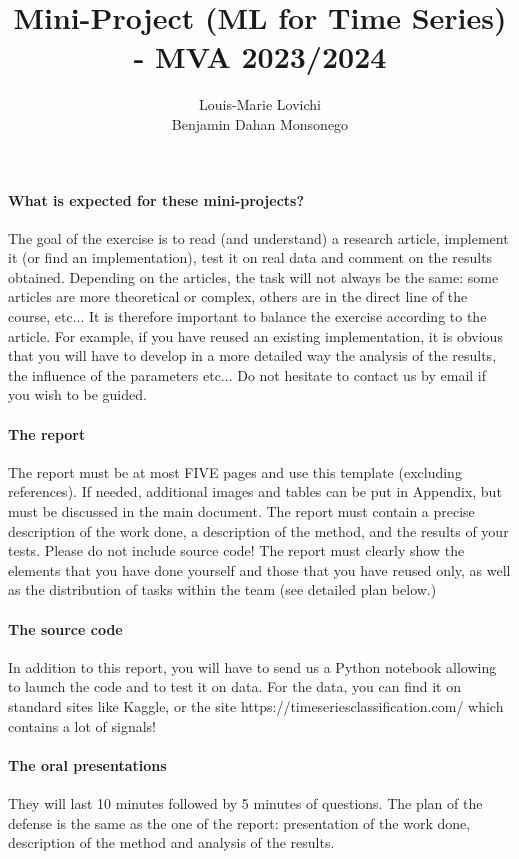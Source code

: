 \documentclass[11pt]{article}
\title{Mini-Project (ML for Time Series) - MVA 2023/2024}
\author{
Louis-Marie Lovichi \email{lm.lovichi@me.com} \\ %
Benjamin Dahan Monsonego \email{benjamin.dahan\_monsonego@ens-paris-saclay.fr} %
}
\begin{document}
\maketitle

\paragraph{What is expected for these mini-projects?}
The goal of the exercise is to read (and understand) a research article, implement it (or find an implementation), test it on real data and comment on the results obtained.
Depending on the articles, the task will not always be the same: some articles are more theoretical or complex, others are in the direct line of the course, etc... It is therefore important to balance the exercise according to the article. For example, if you have reused an existing implementation, it is obvious that you will have to develop in a more detailed way the analysis of the results, the influence of the parameters etc... Do not hesitate to contact us by email if you wish to be guided.

\paragraph{The report}
 The report must be at most FIVE pages and use this template (excluding references). If needed, additional images and tables can be put in Appendix, but must be discussed in the main document. The report must contain a precise description of the work done, a description of the method, and the results of your tests. Please do not include source code! The report must clearly show the elements that you have done yourself and those that you have reused only, as well as the distribution of tasks within the team (see detailed plan below.)
 
 \paragraph{The source code}
In addition to this report, you will have to send us a Python notebook allowing to launch the code and to test it on data. For the data, you can find it on standard sites like Kaggle, or the site https://timeseriesclassification.com/ which contains a lot of signals!


\paragraph{The oral presentations}
They will last 10 minutes followed by 5 minutes of questions. The plan of the defense is the same as the one of the report: presentation of the work done, description of the method and analysis of the results.
\end{document}
